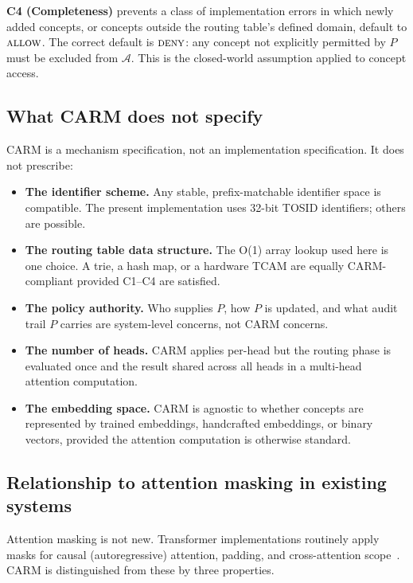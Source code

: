 \documentclass[11pt,a4paper]{article}
\theoremstyle{definition}
\newcommand{\ALLOW}{\mbox{\textsc{allow}}}
\newcommand{\DENY}{\mbox{\textsc{deny}}}
\newcommand{\acc}{\mathcal{A}}
\newcommand{\policy}{P}
\begin{document}
\textbf{C4 (Completeness)} prevents a class of implementation errors in which newly
added concepts, or concepts outside the routing table's defined domain, default to
$\ALLOW$. The correct default is $\DENY$: any concept not explicitly permitted by
$\policy$ must be excluded from $\acc$. This is the closed-world assumption applied
to concept access.

\subsection{What CARM does not specify}

CARM is a mechanism specification, not an implementation specification. It does not
prescribe:

\begin{itemize}
  \item \textbf{The identifier scheme.} Any stable, prefix-matchable identifier
        space is compatible. The present implementation uses 32-bit TOSID
        identifiers; others are possible.
  \item \textbf{The routing table data structure.} The O(1) array lookup used here
        is one choice. A trie, a hash map, or a hardware TCAM are equally
        CARM-compliant provided C1--C4 are satisfied.
  \item \textbf{The policy authority.} Who supplies $\policy$, how $\policy$ is
        updated, and what audit trail $\policy$ carries are system-level concerns,
        not CARM concerns.
  \item \textbf{The number of heads.} CARM applies per-head but the routing phase
        is evaluated once and the result shared across all heads in a multi-head
        attention computation.
  \item \textbf{The embedding space.} CARM is agnostic to whether concepts are
        represented by trained embeddings, handcrafted embeddings, or binary
        vectors, provided the attention computation is otherwise standard.
\end{itemize}

\subsection{Relationship to attention masking in existing systems}

Attention masking is not new. Transformer implementations routinely apply masks for
causal (autoregressive) attention, padding, and cross-attention
scope~\cite{Vaswani2017}. CARM is distinguished from these by three properties.
\end{document}

